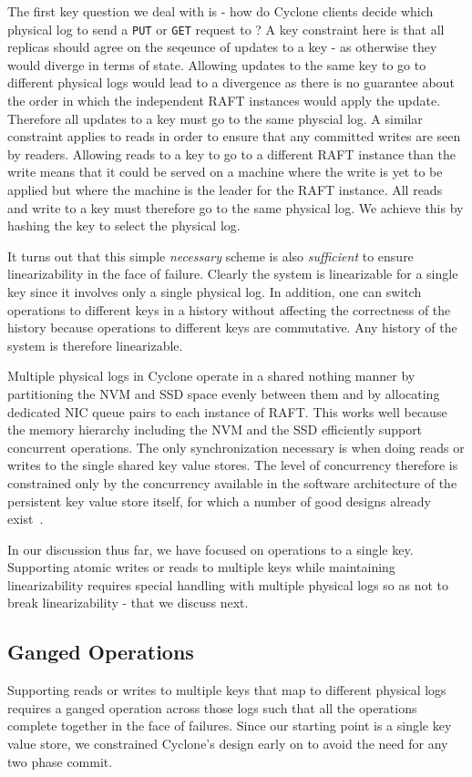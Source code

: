 \documentclass[pageno]{jpaper}
\begin{document}
The first key question we deal with is - how do Cyclone clients decide which
physical log to send a {\tt PUT} or {\tt GET} request to ? A key constraint here
is that all replicas should agree on the seqeunce of updates to a key - as
otherwise they would diverge in terms of state. Allowing updates to the same key
to go to different physical logs would lead to a divergence as there is no
guarantee about the order in which the independent RAFT instances would apply
the update. Therefore all updates to a key must go to the same physcial
log. A similar constraint applies to reads in order to ensure that any committed
writes are seen by readers. Allowing reads to a key to go to a different RAFT
instance than the write means that it could be served on a machine where the
write is yet to be applied but where the machine is the leader for the RAFT
instance. All reads and write to a key must therefore go to the same physical
log. We achieve this by hashing the key to select the physical log.

It turns out that this simple \emph{necessary} scheme is also \emph{sufficient}
to ensure linearizability in the face of failure. Clearly the system is
linearizable for a single key since it involves only a single physical log. In
addition, one can switch operations to different keys in a history without
affecting the correctness of the history because operations to different keys
are commutative. Any history of the system is therefore linearizable.

Multiple physical logs in Cyclone operate in a shared nothing manner by
partitioning the NVM and SSD space evenly between them and by allocating
dedicated NIC queue pairs to each instance of RAFT. This works well because the
memory hierarchy including the NVM and the SSD efficiently support concurrent
operations. The only synchronization necessary is when doing reads or writes to
the single shared key value stores.  The level of concurrency therefore is
constrained only by the concurrency available in the software architecture of
the persistent key value store itself, for which a number of good designs
already exist~\cite{flodb}.

In our discussion thus far, we have focused on operations to a single
key. Supporting atomic writes or reads to multiple keys while maintaining
linearizability requires special handling with multiple physical logs so as not
to break linearizability - that we discuss next.

\subsection{Ganged Operations}
Supporting reads or writes to multiple keys that map to different physical logs
requires a ganged operation across those logs such that all the operations
complete together in the face of failures. Since our starting point is a single
key value store, we constrained Cyclone's design early on to avoid the need for
any two phase commit.
\end{document}
